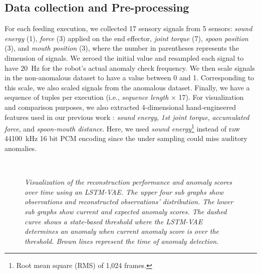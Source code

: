 \documentclass[letterpaper, 10 pt, conference]{ieeeconf}
\begin{document}
\subsection{Data collection and Pre-processing} \label{ss_data_collection}
For each feeding execution, we collected 17 sensory signals from 5 sensors: 
\textit{sound energy} (1), \textit{force} (3) applied on the end effector, \textit{joint torque} (7), \textit{spoon position} (3), and \textit{mouth position} (3), where the number in parentheses represents the dimension of signals. We zeroed the initial value and resampled each signal to have \SI{20}{Hz} for the robot's actual anomaly check frequency. We then scale signals in the non-anomalous dataset to have a value between 0 and 1. Corresponding to this scale, we also scaled signals from the anomalous dataset. Finally, we have a sequence of tuples per execution (i.e., \textit{sequence length} $\times$ 17). For visualization and comparison purposes, we also extracted 4-dimensional hand-engineered features used in our previous work \cite{park2017detection}: \textit{sound energy}, \textit{1st joint torque}, \textit{accumulated force}, and \textit{spoon-mouth distance}. Here, we used \textit{sound energy}\footnote{Root mean square (RMS) of 1,024 frames.} instead of raw \SI{44100}{\kHz} 16 bit PCM encoding since the under sampling could miss auditory anomalies. 


\begin{figure}
	\centering
    \\
	\caption{\textit{Visualization of the reconstruction performance and anomaly scores over time using an LSTM-VAE. The upper four sub graphs show observations and reconstructed observations' distribution. The lower sub graphs show current and expected anomaly scores. The dashed curve shows a state-based threshold where the LSTM-VAE determines an anomaly when current anomaly score is over the threshold. Brown lines represent the time of anomaly detection.}}
    \vspace{-1.5em}
	\label{fig: reconstruction}
\end{figure}
\end{document}

